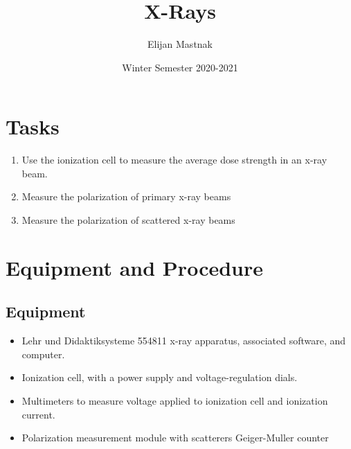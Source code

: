 \documentclass[11pt, a4paper]{article}
\begin{document}
\title{X-Rays}
\author{Elijan Mastnak}
\date{Winter Semester 2020-2021}
\maketitle

\tableofcontents
\newpage


\section{Tasks}
\begin{enumerate}
	\item Use the ionization cell to measure the average dose strength in an x-ray beam.
	
	\item Measure the polarization of primary x-ray beams
	
	\item Measure the polarization of scattered x-ray beams
\end{enumerate}


\section{Equipment and Procedure}
\subsection{Equipment}
\begin{itemize}
	\item Lehr und Didaktiksysteme 554811 x-ray apparatus, associated software, and computer.

	\item Ionization cell, with a power supply and voltage-regulation dials.
	
	\item Multimeters to measure voltage applied to ionization cell and ionization current.
	
	\item Polarization measurement module with scatterers Geiger-Muller counter

\end{itemize}
\end{document}
